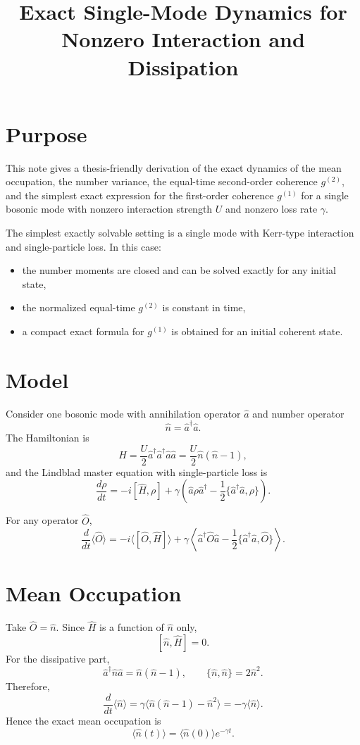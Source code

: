 \documentclass[12pt]{article}
\title{Exact Single-Mode Dynamics for Nonzero Interaction and Dissipation}
\author{}
\date{}
\begin{document}
\maketitle

\section*{Purpose}
This note gives a thesis-friendly derivation of the exact dynamics of the mean occupation, the number variance, the equal-time second-order coherence $g^{(2)}$, and the simplest exact expression for the first-order coherence $g^{(1)}$ for a single bosonic mode with nonzero interaction strength $U$ and nonzero loss rate $\gamma$.

The simplest exactly solvable setting is a single mode with Kerr-type interaction and single-particle loss. In this case:
\begin{itemize}
\item the number moments are closed and can be solved exactly for any initial state,
\item the normalized equal-time $g^{(2)}$ is constant in time,
\item a compact exact formula for $g^{(1)}$ is obtained for an initial coherent state.
\end{itemize}

\section*{Model}
Consider one bosonic mode with annihilation operator $\hat a$ and number operator
\[
\hat n = \hat a^\dagger \hat a.
\]
The Hamiltonian is
\[
\hat H = \frac{U}{2}\hat a^\dagger \hat a^\dagger \hat a \hat a
= \frac{U}{2}\hat n(\hat n-1),
\]
and the Lindblad master equation with single-particle loss is
\[
\frac{d\rho}{dt}
= -i[\hat H,\rho]
+ \gamma\left(
\hat a \rho \hat a^\dagger
- \frac12\{\hat a^\dagger \hat a,\rho\}
\right).
\]

For any operator $\hat O$,
\[
\frac{d}{dt}\langle \hat O\rangle
= -i\langle[\hat O,\hat H]\rangle
+ \gamma\left\langle
\hat a^\dagger \hat O \hat a
- \frac12\{\hat a^\dagger \hat a,\hat O\}
\right\rangle.
\]

\section*{Mean Occupation}
Take $\hat O=\hat n$. Since $\hat H$ is a function of $\hat n$ only,
\[
[\hat n,\hat H]=0.
\]
For the dissipative part,
\[
\hat a^\dagger \hat n \hat a = \hat n(\hat n-1),
\qquad
\{\hat n,\hat n\}=2\hat n^2.
\]
Therefore,
\[
\frac{d}{dt}\langle \hat n\rangle
= \gamma\langle \hat n(\hat n-1)-\hat n^2\rangle
= -\gamma \langle \hat n\rangle.
\]
Hence the exact mean occupation is
\[
\boxed{
\langle \hat n(t)\rangle = \langle \hat n(0)\rangle e^{-\gamma t}.
}
\]
\end{document}
